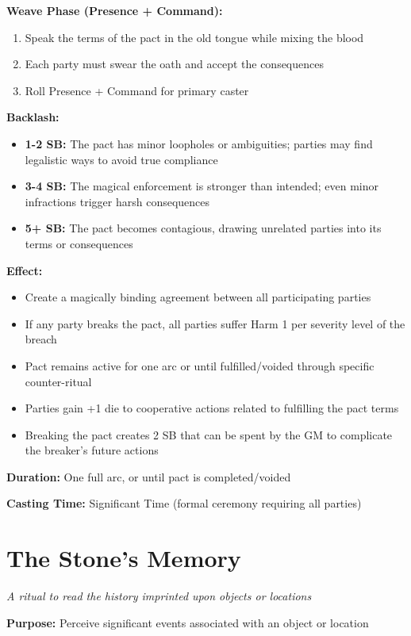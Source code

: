 \textbf{Weave Phase (Presence + Command):}
\begin{enumerate}
\item Speak the terms of the pact in the old tongue while mixing the blood
\item Each party must swear the oath and accept the consequences
\item Roll Presence + Command for primary caster
\end{enumerate}

\textbf{Backlash:}
\begin{itemize}
\item \textbf{1-2 SB:} The pact has minor loopholes or ambiguities; parties may find legalistic ways to avoid true compliance
\item \textbf{3-4 SB:} The magical enforcement is stronger than intended; even minor infractions trigger harsh consequences
\item \textbf{5+ SB:} The pact becomes contagious, drawing unrelated parties into its terms or consequences
\end{itemize}

\textbf{Effect:}
\begin{itemize}
\item Create a magically binding agreement between all participating parties
\item If any party breaks the pact, all parties suffer Harm 1 per severity level of the breach
\item Pact remains active for one arc or until fulfilled/voided through specific counter-ritual
\item Parties gain +1 die to cooperative actions related to fulfilling the pact terms
\item Breaking the pact creates 2 SB that can be spent by the GM to complicate the breaker's future actions
\end{itemize}

\textbf{Duration:} One full arc, or until pact is completed/voided

\textbf{Casting Time:} Significant Time (formal ceremony requiring all parties)

\section*{The Stone's Memory}
\textit{A ritual to read the history imprinted upon objects or locations}

\textbf{Purpose:} Perceive significant events associated with an object or location

